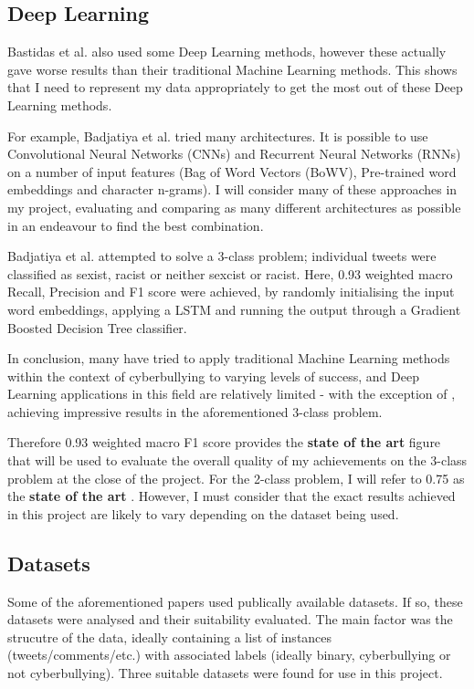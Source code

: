 \documentclass[12pt,a4paper]{article}
\begin{document}
\subsection{Deep Learning}
Bastidas et al. \citeyear[p.3]{Hack} also used some Deep Learning methods, however these actually gave worse results than their traditional Machine Learning methods. This shows that I need to represent my data appropriately to get the most out of these Deep Learning methods.

For example, Badjatiya et al. \cite{Badjatiya} tried many architectures. It is possible to use Convolutional Neural Networks (CNNs) and Recurrent Neural Networks (RNNs) on a number of input features (Bag of Word Vectors (BoWV), Pre-trained word embeddings and character n-grams). I will consider many of these approaches in my project, evaluating and comparing as many different architectures as possible in an endeavour to find the best combination.

Badjatiya et al. \cite{Badjatiya} attempted to solve a 3-class problem; individual tweets were classified as sexist, racist or neither sexcist or racist. Here, 0.93 weighted macro Recall, Precision and F1 score were achieved, by randomly initialising the input word embeddings, applying a LSTM and running the output through a Gradient Boosted Decision Tree classifier. 

In conclusion, many have tried to apply traditional Machine Learning methods within the context of cyberbullying to varying levels of success, and Deep Learning applications in this field are relatively limited - with the exception of \cite{Badjatiya}, achieving impressive results in the aforementioned 3-class problem. 

Therefore 0.93 weighted macro F1 score provides the \textbf{state of the art} figure that will be used to evaluate the overall quality of my achievements on the 3-class problem at the close of the project. For the 2-class problem, I will refer to 0.75 as the \textbf{state of the art} \cite{Hack}. However, I must consider that the exact results achieved in this project are likely to vary depending on the dataset being used.


\subsection{Datasets}
Some of the aforementioned papers used publically available datasets. If so, these datasets were analysed and their suitability evaluated. The main factor was the strucutre of the data, ideally containing a list of instances (tweets/comments/etc.) with associated labels (ideally binary, cyberbullying or not cyberbullying). Three suitable datasets were found for use in this project.
\end{document}

